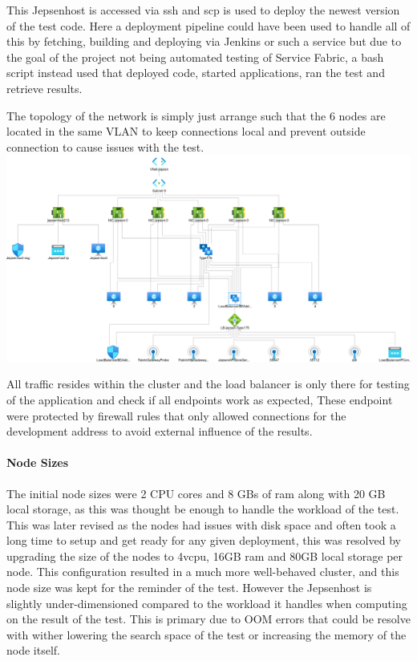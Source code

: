 \documentclass[a4paper,10pt,titlepage]{report}
\begin{document}
    This Jepsenhost is accessed via ssh and scp is used to deploy the newest version of the test code. Here a deployment pipeline could have been used to handle all of this by fetching, building and deploying via Jenkins or such a service but due to the goal of the project not being automated testing of Service Fabric, a bash script instead used that deployed code, started applications, ran the test and retrieve results.

    The topology of the network is simply just arrange such that the 6 nodes are located in the same VLAN to keep connections local and prevent outside connection to cause issues with the test.
    \includegraphics[scale=0.3]{images/topology.png}

    All traffic resides within the cluster and the load balancer is only there for testing of the application and check if all endpoints work as expected, These endpoint were protected by firewall rules that only allowed connections for the development address to avoid external influence of the results.

    \paragraph*{Node Sizes}

    The initial node sizes were 2 CPU cores and 8 GBs of ram along with 20 GB local storage, as this was thought be enough to handle the workload of the test. This was later revised as the nodes had issues with disk space and often took a long time to setup and get ready for any given deployment, this was resolved by upgrading the size of the nodes to 4vcpu, 16GB ram and 80GB local storage per node. This configuration resulted in a much more well-behaved cluster, and this node size was kept for the reminder of the test. However the Jepsenhost is slightly under-dimensioned compared to the workload it handles when computing on the result of the test. This is primary due to OOM errors that could be resolve with wither lowering the search space of the test or increasing the memory of the node itself.
\end{document}
